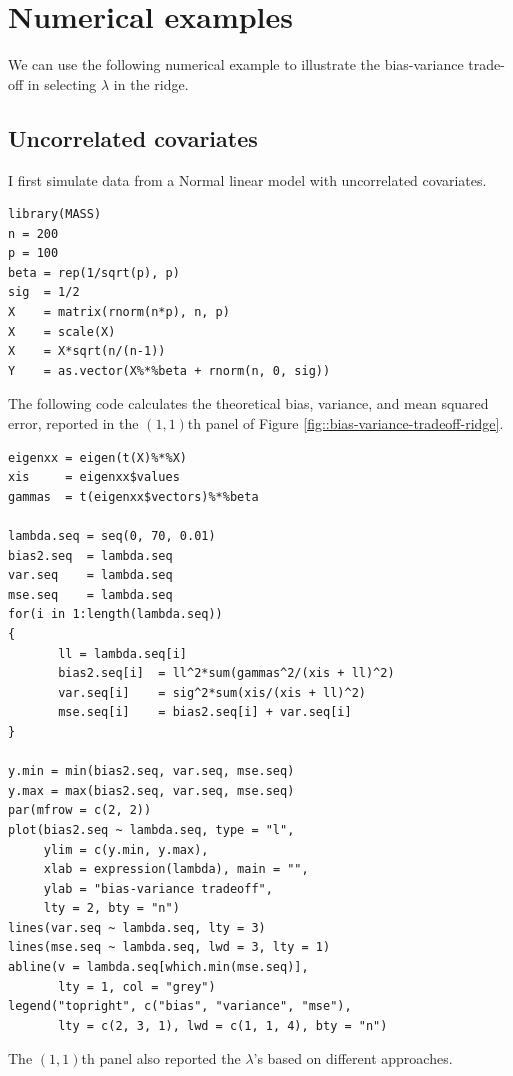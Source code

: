  


\section{Numerical examples}

We can use the following numerical example to illustrate the bias-variance trade-off in selecting $\lambda$ in the ridge. 




\subsection{Uncorrelated covariates}
 I first simulate data from a Normal linear model with uncorrelated covariates. 
\begin{lstlisting}
library(MASS)
n = 200
p = 100
beta = rep(1/sqrt(p), p) 
sig  = 1/2
X    = matrix(rnorm(n*p), n, p)
X    = scale(X)
X    = X*sqrt(n/(n-1))
Y    = as.vector(X%*%beta + rnorm(n, 0, sig))
\end{lstlisting}


The following code calculates the theoretical bias, variance, and mean squared error, reported in the $(1,1)$th panel of Figure \ref{fig::bias-variance-tradeoff-ridge}.  
 
\begin{lstlisting}
eigenxx = eigen(t(X)%*%X)
xis     = eigenxx$values
gammas  = t(eigenxx$vectors)%*%beta

lambda.seq = seq(0, 70, 0.01)
bias2.seq  = lambda.seq
var.seq    = lambda.seq
mse.seq    = lambda.seq
for(i in 1:length(lambda.seq))
{
	   ll = lambda.seq[i]
	   bias2.seq[i]  = ll^2*sum(gammas^2/(xis + ll)^2)
	   var.seq[i]    = sig^2*sum(xis/(xis + ll)^2)
	   mse.seq[i]    = bias2.seq[i] + var.seq[i]
}
 
y.min = min(bias2.seq, var.seq, mse.seq)
y.max = max(bias2.seq, var.seq, mse.seq)
par(mfrow = c(2, 2))
plot(bias2.seq ~ lambda.seq, type = "l",
     ylim = c(y.min, y.max), 
     xlab = expression(lambda), main = "", 
     ylab = "bias-variance tradeoff", 
     lty = 2, bty = "n")
lines(var.seq ~ lambda.seq, lty = 3)
lines(mse.seq ~ lambda.seq, lwd = 3, lty = 1)
abline(v = lambda.seq[which.min(mse.seq)], 
       lty = 1, col = "grey")
legend("topright", c("bias", "variance", "mse"),
       lty = c(2, 3, 1), lwd = c(1, 1, 4), bty = "n")
\end{lstlisting}


The  $(1,1)$th panel also reported the $\lambda$'s based on different approaches. 

